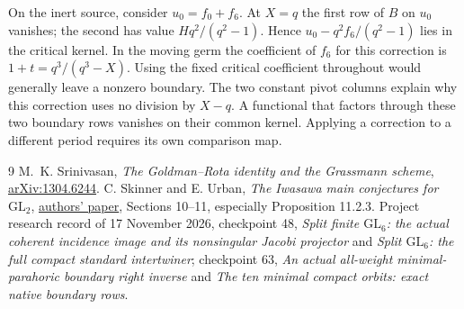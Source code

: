 \documentclass[11pt]{article}
\begin{document}
On the inert source, consider $u_0=f_0+f_6$. At $X=q$ the first
row of $B$ on $u_0$ vanishes; the second has value $Hq^2/(q^2-1)$.
Hence $u_0-q^2 f_6/(q^2-1)$ lies in the critical kernel. In the
moving germ the coefficient of $f_6$ for this correction is
$1+t=q^3/(q^3-X)$. Using the fixed critical coefficient throughout
would generally leave a nonzero boundary. The two constant pivot
columns explain why this correction uses no division by $X-q$.
A functional that factors through these two boundary rows vanishes on
their common kernel. Applying a correction to a different period
requires its own comparison map.

\begin{thebibliography}{9}
 M.~K. Srinivasan,
\emph{The Goldman--Rota identity and the Grassmann scheme},
\href{https://arxiv.org/abs/1304.6244}{arXiv:1304.6244}.
 C. Skinner and E. Urban,
\emph{The Iwasawa main conjectures for $\mathrm{GL}_2$},
\href{https://www.math.columbia.edu/~urban/eurp/MC.pdf}{authors' paper},
Sections 10--11, especially Proposition 11.2.3.
 Project research record of 17 November 2026,
checkpoint 48, \emph{Split finite $\mathrm{GL}_6$: the actual
coherent incidence image and its nonsingular Jacobi projector} and
\emph{Split $\mathrm{GL}_6$: the full compact standard intertwiner};
checkpoint 63, \emph{An actual all-weight minimal-parahoric boundary
right inverse} and \emph{The ten minimal compact orbits: exact native
boundary rows}.
\end{thebibliography}
\end{document}

